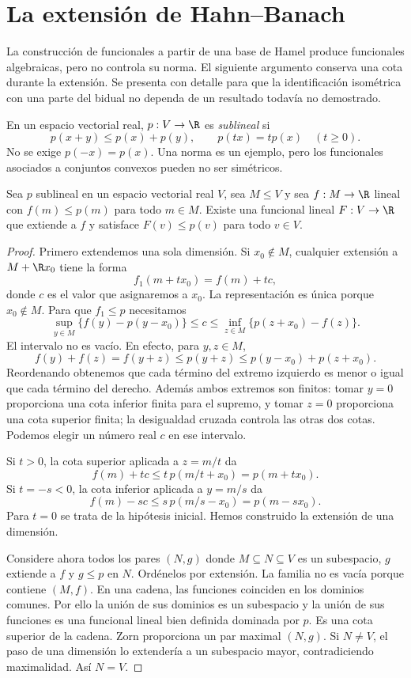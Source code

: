 \section{La extensión de Hahn--Banach}

La construcción de funcionales a partir de una base de Hamel produce funcionales algebraicas, pero no controla su norma. El siguiente argumento conserva una cota durante la extensión. Se presenta con detalle para que la identificación isométrica con una parte del bidual no dependa de un resultado todavía no demostrado.

\begin{definicion}
En un espacio vectorial real, $p:V\to\R$ es \emph{sublineal} si
\[
 p(x+y)\leq p(x)+p(y),\qquad p(tx)=tp(x)\quad(t\geq0).
\]
No se exige $p(-x)=p(x)$. Una norma es un ejemplo, pero los funcionales asociados a conjuntos convexos pueden no ser simétricos.
\end{definicion}

\begin{teorema}\label{ch21:hb-real}
Sea $p$ sublineal en un espacio vectorial real $V$, sea $M\leq V$ y sea $f:M\to\R$ lineal con $f(m)\leq p(m)$ para todo $m\in M$. Existe una funcional lineal $F:V\to\R$ que extiende a $f$ y satisface $F(v)\leq p(v)$ para todo $v\in V$.
\end{teorema}
\begin{proof}
Primero extendemos una sola dimensión. Si $x_0\notin M$, cualquier extensión a $M+\R x_0$ tiene la forma
\[
 f_1(m+tx_0)=f(m)+tc,
\]
donde $c$ es el valor que asignaremos a $x_0$. La representación es única porque $x_0\notin M$. Para que $f_1\leq p$ necesitamos
\[
 \sup_{y\in M}\{f(y)-p(y-x_0)\}\leq c
 \leq\inf_{z\in M}\{p(z+x_0)-f(z)\}.
\]
El intervalo no es vacío. En efecto, para $y,z\in M$,
\[
 f(y)+f(z)=f(y+z)\leq p(y+z)
 \leq p(y-x_0)+p(z+x_0).
\]
Reordenando obtenemos que cada término del extremo izquierdo es menor o igual que cada término del derecho. Además ambos extremos son finitos: tomar $y=0$ proporciona una cota inferior finita para el supremo, y tomar $z=0$ proporciona una cota superior finita; la desigualdad cruzada controla las otras dos cotas. Podemos elegir un número real $c$ en ese intervalo.

Si $t>0$, la cota superior aplicada a $z=m/t$ da
\[
 f(m)+tc\leq t\,p(m/t+x_0)=p(m+tx_0).
\]
Si $t=-s<0$, la cota inferior aplicada a $y=m/s$ da
\[
 f(m)-sc\leq s\,p(m/s-x_0)=p(m-sx_0).
\]
Para $t=0$ se trata de la hipótesis inicial. Hemos construido la extensión de una dimensión.

Considere ahora todos los pares $(N,g)$ donde $M\subseteq N\subseteq V$ es un subespacio, $g$ extiende a $f$ y $g\leq p$ en $N$. Ordénelos por extensión. La familia no es vacía porque contiene $(M,f)$. En una cadena, las funciones coinciden en los dominios comunes. Por ello la unión de sus dominios es un subespacio y la unión de sus funciones es una funcional lineal bien definida dominada por $p$. Es una cota superior de la cadena. Zorn proporciona un par maximal $(N,g)$. Si $N\ne V$, el paso de una dimensión lo extendería a un subespacio mayor, contradiciendo maximalidad. Así $N=V$.
\end{proof}

